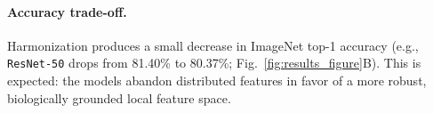 \documentclass[submission]{ccn}
\begin{document}
\paragraph{Accuracy trade-off.}
Harmonization produces a small decrease in ImageNet top-1 accuracy (e.g., \texttt{ResNet-50} drops from 81.40\% to 80.37\%; Fig.~\ref{fig:results_figure}B). This is expected: the models abandon distributed features in favor of a more robust, biologically grounded local feature space.
\end{document}
